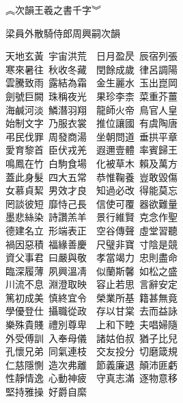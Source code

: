 \documentclass[a4paper,twocolumn]{article}
\begin{document}
\begin{Huge}
︽次韻王羲之書千字︾
\\
\end{Huge}
\begin{huge}
梁員外散騎侍郎周興嗣次韻
\\

\end{huge}

\begin{Large}

天地玄黃\ 宇宙洪荒　日月盈昃\ 辰宿列張\\
寒來暑往\ 秋收冬藏　閏餘成歲\ 律呂調陽\\
雲騰致雨\ 露結為霜　金生麗水\ 玉出崑岡\\
劍號巨闕\ 珠稱夜光　果珍李柰\ 菜重芥薑\\
海鹹河淡\ 鱗潛羽翔　龍師火帝\ 鳥官人皇\\
始制文字\ 乃服衣裳　推位讓國\ 有虞陶唐\\
弔民伐罪\ 周發商湯　坐朝問道\ 垂拱平章\\
愛育黎首\ 臣伏戎羌　遐邇壹體\ 率賓歸王\\
鳴鳳在竹\ 白駒食場　化被草木\ 賴及萬方\\

蓋此身髮\ 四大五常　恭惟鞠養\ 豈敢毀傷\\
女慕貞絜\ 男效才良　知過必改\ 得能莫忘\\
罔談彼短\ 靡恃己長　信使可覆\ 器欲難量\\
墨悲絲染\ 詩讚羔羊　景行維賢\ 克念作聖\\
德建名立\ 形端表正　空谷傳聲\ 虛堂習聽\\
禍因惡積\ 福緣善慶　尺璧非寶\ 寸陰是競\\
資父事君\ 曰嚴與敬　孝當竭力\ 忠則盡命\\
臨深履薄\ 夙興溫凊　似蘭斯馨\ 如松之盛\\
川流不息\ 淵澄取映　容止若思\ 言辭安定\\
篤初成美\ 慎終宜令　榮業所基\ 籍甚無竟\\
學優登仕\ 攝職從政　存以甘棠\ 去而益詠\\
樂殊貴賤\ 禮別尊卑　上和下睦\ 夫唱婦隨\\
外受傅訓\ 入奉母儀　諸姑伯叔\ 猶子比兒\\
孔懷兄弟\ 同氣連枝　交友投分\ 切磨箴規\\
仁慈隱惻\ 造次弗離　節義廉退\ 顛沛匪虧\\
性靜情逸\ 心動神疲　守真志滿\ 逐物意移\\
堅持雅操\ 好爵自縻\\


\end{Large}
\end{document}
